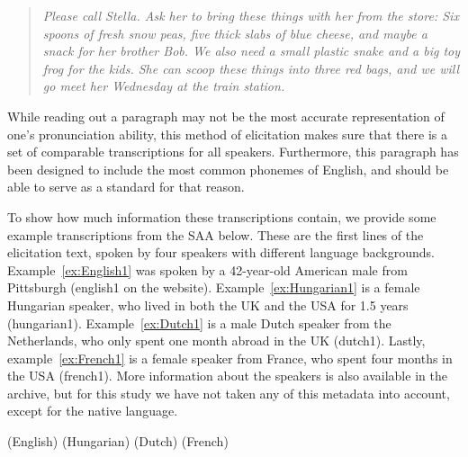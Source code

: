 \documentclass[output=paper]{LSP/langsci}
\begin{document}
\begin{quote}
\textit{Please call Stella. Ask her to bring these things with her from the store: Six spoons of fresh snow peas, five thick slabs of blue cheese, and maybe a snack for her brother Bob. We also need a small plastic snake and a big toy frog for the kids. She can scoop these things into three red bags, and we will go meet her Wednesday at the train station.}
\end{quote}

While reading out a paragraph may not be the most accurate representation of one's pronunciation ability, this method of elicitation makes sure that there is a set of comparable transcriptions for all speakers. Furthermore, this paragraph has been designed to include the most common phonemes of English, and should be able to serve as a standard for that reason.

To show how much information these transcriptions contain, we provide some example transcriptions from the SAA below. These are the first lines of the elicitation text, spoken by four speakers with different language backgrounds. Example~\ref{ex:English1} was spoken by a 42-year-old American male from Pittsburgh (english1 on the website). Example~\ref{ex:Hungarian1} is a female Hungarian speaker, who lived in both the UK and the USA for 1.5 years (hungarian1). Example~\ref{ex:Dutch1} is a male Dutch speaker from the Netherlands, who only spent one month abroad in the UK (dutch1). Lastly, example~\ref{ex:French1} is a female speaker from France, who spent four months in the USA (french1). More information about the speakers is also available in the archive, but for this study we have not taken any of this metadata into account, except for the native language.

\begin{exe}
\ex \label{ex:English1} {} (English)
\ex \label{ex:Hungarian1} {} (Hungarian)
\ex \label{ex:Dutch1} {} (Dutch)
\ex \label{ex:French1} {} (French)
\end{exe}
\end{document}
